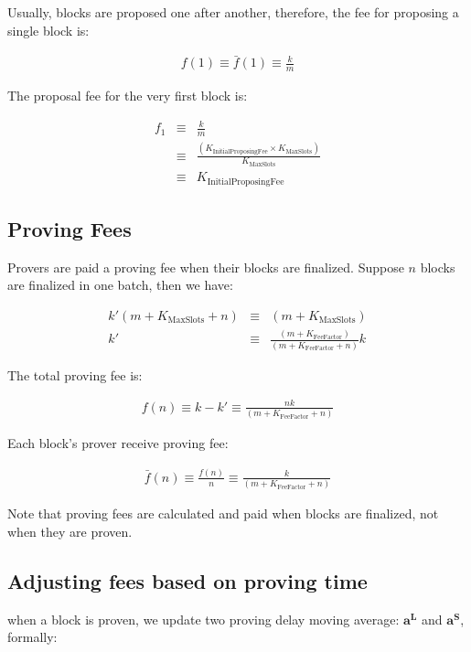 \documentclass[9pt,oneside]{amsart}
\begin{document}
\begin{multicols}{2}
Usually, blocks are proposed one after another, therefore, the fee for proposing a single block is:

\begin{eqnarray}
f(1)  \equiv \bar{f}(1)  \equiv \frac{k}{m}
\end{eqnarray}



The proposal fee for the very first block is:



\begin{eqnarray}
f_1  & \equiv & \frac{k}{m}  \\
\nonumber & \equiv & \frac{ (K_{\mathrm{InitialProposingFee}} \times K_{\mathrm{MaxSlots}})}{K_{\mathrm{MaxSlots}}}  \\
\nonumber & \equiv &K_{\mathrm{InitialProposingFee}}
\end{eqnarray}


\subsection{Proving Fees}

Provers are paid a proving fee when their blocks are finalized. Suppose $n$ blocks are finalized in one batch, then we have:

\begin{eqnarray}
k'  (m+K_{\mathrm{MaxSlots}}+n) & \equiv  & (m+K_{\mathrm{MaxSlots}}) \\
\nonumber k'  & \equiv & \frac{(m+K_{\mathrm{FeeFactor}})}{(m+K_{\mathrm{FeeFactor}}+n)} k
\end{eqnarray}



The total proving fee is:

\begin{eqnarray}
f(n)  \equiv  k - k'  \equiv \frac{nk}{(m+K_{\mathrm{FeeFactor}}+n)}
\end{eqnarray}


Each block's prover receive proving fee:


\begin{eqnarray}
\bar{f}(n)  \equiv \frac{f(n)}{n}  \equiv \frac{k}{(m+K_{\mathrm{FeeFactor}}+n)}
\end{eqnarray}

Note that proving fees are calculated and paid when blocks are finalized, not when they are proven.

\subsection{Adjusting fees based on proving time}
when a block is proven, we update two proving delay moving average:  $\boldsymbol{a^L}$ and $\boldsymbol{a^S}$, formally:


\end{multicols}
\end{document}
